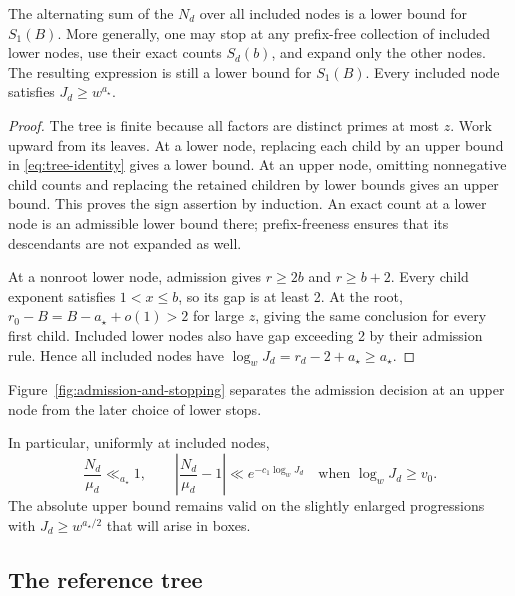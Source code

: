 \begin{lemma}\label{lem:tree-lower-bound}
The alternating sum of the $N_d$ over all included nodes is a lower
bound for $S_1(B)$. More generally, one may stop at any prefix-free
collection of included lower nodes, use their exact counts $S_d(b)$,
and expand only the other nodes. The resulting expression is still
a lower bound for $S_1(B)$.
Every included node satisfies $J_d\ge w^{a_\star}$.
\end{lemma}

\begin{proof}
The tree is finite because all factors are distinct primes at most
$z$. Work upward from its leaves. At a lower node, replacing each
child by an upper bound in \eqref{eq:tree-identity} gives a lower
bound. At an upper node, omitting nonnegative child counts and
replacing the retained children by lower bounds gives an upper bound.
This proves the sign assertion by induction. An exact count at a
lower node is an admissible lower bound there; prefix-freeness ensures
that its descendants are not expanded as well.

At a nonroot lower node, admission gives
$r\ge2b$ and $r\ge b+2$. Every child exponent satisfies $1<x\le b$,
so its gap is at least 2. At the root,
$r_0-B=B-a_\star+o(1)>2$ for large $z$, giving the same conclusion
for every first child. Included lower nodes also have gap exceeding
2 by their admission rule. Hence all included nodes have
$\log_wJ_d=r_d-2+a_\star\ge a_\star$.
\end{proof}

Figure~\ref{fig:admission-and-stopping} separates the admission decision
at an upper node from the later choice of lower stops.


In particular, uniformly at included nodes,
\begin{equation}\label{eq:tree-small-counts}
 \frac{N_d}{\mu_d}\ll_{a_\star}1,
 \qquad
 \left|\frac{N_d}{\mu_d}-1\right|
 \ll e^{-c_1\log_wJ_d}
 \quad\text{when }\log_wJ_d\ge v_0.
\end{equation}
The absolute upper bound remains valid on the slightly enlarged
progressions with $J_d\ge w^{a_\star/2}$ that will arise in boxes.

\subsection{The reference tree}

